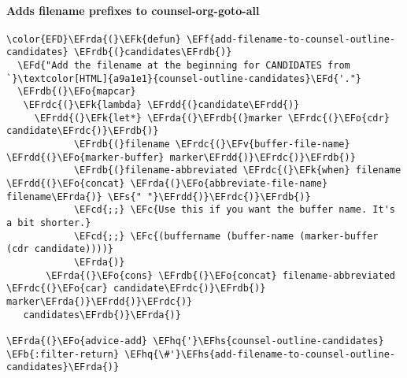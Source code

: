 \documentclass[a4wide,10pt]{article}
\newcommand{\EFc}[1]{\textcolor{EFc}{#1}} %
\newcommand{\EFcd}[1]{\textcolor{EFcd}{#1}} %
\newcommand{\EFs}[1]{\textcolor{EFs}{#1}} %
\newcommand{\EFd}[1]{\textcolor{EFd}{#1}} %
\newcommand{\EFk}[1]{\textcolor{EFk}{#1}} %
\newcommand{\EFb}[1]{\textcolor{EFb}{#1}} %
\newcommand{\EFf}[1]{\textcolor{EFf}{#1}} %
\newcommand{\EFv}[1]{\textcolor{EFv}{#1}} %
\newcommand{\EFo}[1]{\textcolor{EFo}{#1}} %
\newcommand{\EFhq}[1]{\textcolor{EFhq}{#1}} %
\newcommand{\EFhs}[1]{\textcolor{EFhs}{#1}} %
\newcommand{\EFrda}[1]{\textcolor{EFrda}{#1}} %
\newcommand{\EFrdb}[1]{\textcolor{EFrdb}{#1}} %
\newcommand{\EFrdc}[1]{\textcolor{EFrdc}{#1}} %
\newcommand{\EFrdd}[1]{\textcolor{EFrdd}{#1}} %
\begin{document}
\paragraph{Adds filename prefixes to counsel-org-goto-all}
\label{sec:orgbf093c2}
\begin{Code}
\begin{Verbatim}
\color{EFD}\EFrda{(}\EFk{defun} \EFf{add-filename-to-counsel-outline-candidates} \EFrdb{(}candidates\EFrdb{)}
  \EFd{"Add the filename at the beginning for CANDIDATES from `}\textcolor[HTML]{a9a1e1}{counsel-outline-candidates}\EFd{'."}
  \EFrdb{(}\EFo{mapcar}
   \EFrdc{(}\EFk{lambda} \EFrdd{(}candidate\EFrdd{)}
     \EFrdd{(}\EFk{let*} \EFrda{(}\EFrdb{(}marker \EFrdc{(}\EFo{cdr} candidate\EFrdc{)}\EFrdb{)}
            \EFrdb{(}filename \EFrdc{(}\EFv{buffer-file-name} \EFrdd{(}\EFo{marker-buffer} marker\EFrdd{)}\EFrdc{)}\EFrdb{)}
            \EFrdb{(}filename-abbreviated \EFrdc{(}\EFk{when} filename \EFrdd{(}\EFo{concat} \EFrda{(}\EFo{abbreviate-file-name} filename\EFrda{)} \EFs{" "}\EFrdd{)}\EFrdc{)}\EFrdb{)}
            \EFcd{;;} \EFc{Use this if you want the buffer name. It's a bit shorter.}
            \EFcd{;;} \EFc{(buffername (buffer-name (marker-buffer (cdr candidate))))}
            \EFrda{)}
       \EFrda{(}\EFo{cons} \EFrdb{(}\EFo{concat} filename-abbreviated \EFrdc{(}\EFo{car} candidate\EFrdc{)}\EFrdb{)} marker\EFrda{)}\EFrdd{)}\EFrdc{)}
   candidates\EFrdb{)}\EFrda{)}

\EFrda{(}\EFo{advice-add} \EFhq{'}\EFhs{counsel-outline-candidates} \EFb{:filter-return} \EFhq{\#'}\EFhs{add-filename-to-counsel-outline-candidates}\EFrda{)}
\end{Verbatim}
\end{Code}
\end{document}
